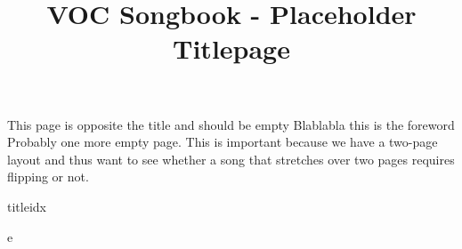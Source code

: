 \documentclass[twoside]{article}
\begin{document}
\title{VOC Songbook - Placeholder Titlepage}
\begin{titlepage}
\maketitle
\thispagestyle{empty}
\end{titlepage}
\newpage
This page is opposite the title and should be empty
\newpage
Blablabla this is the foreword
\newpage
Probably one more empty page. This is important because we have a 
two-page layout and thus want to see whether a song that stretches over 
two pages requires flipping or not. 


\begin{songs}{titleidx}
























e









































\end{songs}
\end{document}
